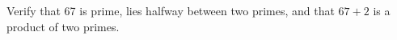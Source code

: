 Verify that 67 is prime, lies halfway between two primes, and that $67+2$ is a product of two primes.
